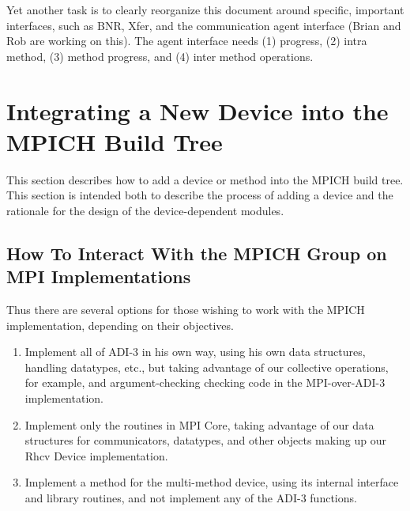 \documentclass[dvipdfm]{article}
\begin{document}
Yet another task is to clearly reorganize this document around
specific, important interfaces, such as BNR, Xfer, and the
communication agent interface (Brian and Rob are working on this).
The agent interface needs (1) progress, (2) intra method, (3) method
progress, and (4) inter method operations.


%

%


\section{Integrating a New Device into the MPICH Build Tree}
This section describes how to add a device or method into the MPICH
build tree.  This section is intended both to describe the process of
adding a device and the rationale for the design of the
device-dependent modules.

\subsection{How To Interact With the MPICH Group on MPI Implementations}
\label{sec:collaborators}

Thus there are several options for those wishing to work with the
MPICH implementation, depending on their objectives.
\begin{enumerate}
\item Implement all of ADI-3 in his own way, using his
  own data structures, handling datatypes, etc., but taking advantage of our
  collective operations, for example, and argument-checking checking code in
  the MPI-over-ADI-3 implementation.
\item Implement only the routines in MPI Core, taking
  advantage of our data structures for communicators, datatypes, and other
  objects making up our Rhcv Device implementation.
\item Implement a method for the multi-method device, using its internal
  interface and library routines, and not implement any of the ADI-3 functions.
\end{enumerate}
\end{document}
